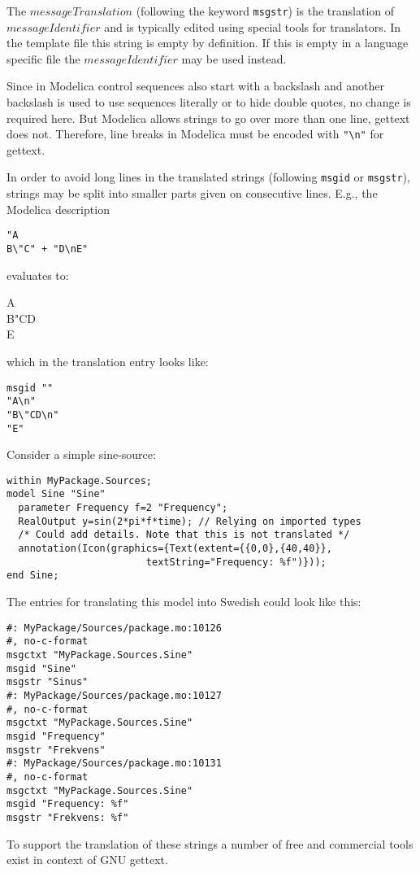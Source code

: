 \begin{nonnormative}
The $\mathit{messageTranslation}$ (following the keyword \lstinline!msgstr!) is the translation of $\mathit{messageIdentifier}$ and is typically edited using special tools for translators.
In the template file this string is empty by definition.
If this is empty in a language specific file the $\mathit{messageIdentifier}$ may be used instead.
\end{nonnormative}

\begin{nonnormative}
Since in Modelica control sequences also start with a backslash and another backslash is used to use sequences literally or to hide double quotes, no change is required here.
But Modelica allows strings to go over more than one line, gettext does not.
Therefore, line breaks in Modelica must be encoded with \lstinline!"\n"! for gettext.

In order to avoid long lines in the translated strings (following \lstinline!msgid! or \lstinline!msgstr!), strings may be split into smaller parts given on consecutive lines.
E.g., the Modelica description
\begin{lstlisting}
"A
B\"C" + "D\nE"
\end{lstlisting}
evaluates to:\par
\hspace{1em}\begin{minipage}{0.5\textwidth}
A\\
B"CD\\
E
\end{minipage}\par
which in the translation entry looks like:
\begin{lstlisting}
msgid ""
"A\n"
"B\"CD\n"
"E"
\end{lstlisting}
\end{nonnormative}

\begin{example}
Consider a simple sine-source:
\begin{lstlisting}[language=modelica]
within MyPackage.Sources;
model Sine "Sine"
  parameter Frequency f=2 "Frequency";
  RealOutput y=sin(2*pi*f*time); // Relying on imported types
  /* Could add details. Note that this is not translated */
  annotation(Icon(graphics={Text(extent={{0,0},{40,40}},
                        textString="Frequency: %f")}));
end Sine;
\end{lstlisting}
The entries for translating this model into Swedish could look like this:
\begin{lstlisting}
#: MyPackage/Sources/package.mo:10126
#, no-c-format
msgctxt "MyPackage.Sources.Sine"
msgid "Sine"
msgstr "Sinus"
#: MyPackage/Sources/package.mo:10127
#, no-c-format
msgctxt "MyPackage.Sources.Sine"
msgid "Frequency"
msgstr "Frekvens"
#: MyPackage/Sources/package.mo:10131
#, no-c-format
msgctxt "MyPackage.Sources.Sine"
msgid "Frequency: %f"
msgstr "Frekvens: %f"
\end{lstlisting}
\end{example}

\begin{nonnormative}
To support the translation of these strings a number of free and commercial tools exist in context of GNU gettext.
\end{nonnormative}
